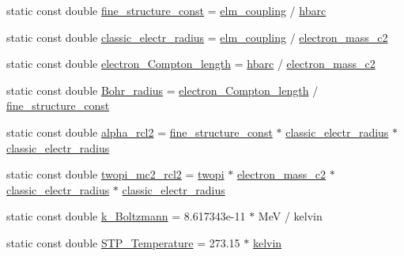 \begin{DoxyCompactItemize}
\item 
static const double \hyperlink{namespacedd4hep_aa979b30c6c7f9ba61132327d4584bfde}{fine\_\-structure\_\-const} = \hyperlink{namespacedd4hep_ace30ae02d909a752d5e3f2138bf4ecb1}{elm\_\-coupling} / \hyperlink{namespacedd4hep_aee6340c5f86bb7ae1edcc2a90efa056e}{hbarc}
\item 
static const double \hyperlink{namespacedd4hep_ab829ac901c489f46802352c5e2b3c165}{classic\_\-electr\_\-radius} = \hyperlink{namespacedd4hep_ace30ae02d909a752d5e3f2138bf4ecb1}{elm\_\-coupling} / \hyperlink{namespacedd4hep_a90fb8853ce4da9b13bd108593b2d154d}{electron\_\-mass\_\-c2}
\item 
static const double \hyperlink{namespacedd4hep_ae9b92fa47cc9555cea0d6fa97a9036a3}{electron\_\-Compton\_\-length} = \hyperlink{namespacedd4hep_aee6340c5f86bb7ae1edcc2a90efa056e}{hbarc} / \hyperlink{namespacedd4hep_a90fb8853ce4da9b13bd108593b2d154d}{electron\_\-mass\_\-c2}
\item 
static const double \hyperlink{namespacedd4hep_a8ac45765a3f92b051e7536784ce5f6d3}{Bohr\_\-radius} = \hyperlink{namespacedd4hep_ae9b92fa47cc9555cea0d6fa97a9036a3}{electron\_\-Compton\_\-length} / \hyperlink{namespacedd4hep_aa979b30c6c7f9ba61132327d4584bfde}{fine\_\-structure\_\-const}
\item 
static const double \hyperlink{namespacedd4hep_affee5485f0351ee3618be1021c703e23}{alpha\_\-rcl2} = \hyperlink{namespacedd4hep_aa979b30c6c7f9ba61132327d4584bfde}{fine\_\-structure\_\-const} $\ast$ \hyperlink{namespacedd4hep_ab829ac901c489f46802352c5e2b3c165}{classic\_\-electr\_\-radius} $\ast$ \hyperlink{namespacedd4hep_ab829ac901c489f46802352c5e2b3c165}{classic\_\-electr\_\-radius}
\item 
static const double \hyperlink{namespacedd4hep_a5db1b84c8dc851581b5ba57b661f575f}{twopi\_\-mc2\_\-rcl2} = \hyperlink{namespacedd4hep_ae89c0c70c74b5fd0c1972865846822d7}{twopi} $\ast$ \hyperlink{namespacedd4hep_a90fb8853ce4da9b13bd108593b2d154d}{electron\_\-mass\_\-c2} $\ast$ \hyperlink{namespacedd4hep_ab829ac901c489f46802352c5e2b3c165}{classic\_\-electr\_\-radius} $\ast$ \hyperlink{namespacedd4hep_ab829ac901c489f46802352c5e2b3c165}{classic\_\-electr\_\-radius}
\item 
static const double \hyperlink{namespacedd4hep_afc99056ae68c67788d6d7555a866e175}{k\_\-Boltzmann} = 8.617343e-\/11 $\ast$ MeV / kelvin
\item 
static const double \hyperlink{namespacedd4hep_a3036c66b7815e25873b1183c2af953d6}{STP\_\-Temperature} = 273.15 $\ast$ \hyperlink{namespacedd4hep_ae4984489719e11b38858934cc4c1e54e}{kelvin}

\end{DoxyCompactItemize}
